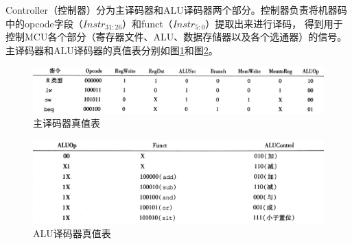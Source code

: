 \documentclass[a4paper]{article}
\begin{document}
				Controller（控制器）分为主译码器和ALU译码器两个部分。控制器负责将机器码中的opcode字段（$Instr_{31:26}$）和funct（$Instr_{5:0}$）提取出来进行译码，
				得到用于控制MCU各个部分（寄存器文件、ALU、数据存储器以及各个选通器）的信号。主译码器和ALU译码器的真值表分别如图\ref{main decoder truth tabel}和图\ref{ALU decoder truth table}。\par
				\begin{figure}[htbp]
					\centering
					\includegraphics[scale=0.15]{主译码器真值表.jpg}
					\caption{主译码器真值表}
					\label{main decoder truth tabel}
				\end{figure}

				\begin{figure}[htbp]
					\centering
					\includegraphics[scale=0.15]{ALU译码器真值表.jpg}
					\caption{ALU译码器真值表}
					\label{ALU decoder truth table}
				\end{figure}
\end{document}
